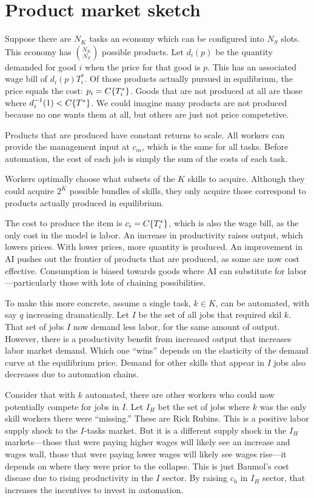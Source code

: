\documentclass{article}
\begin{document}
\section{Product market sketch}
Suppose there are $N_K$ tasks an economy which can be configured into $N_S$ slots.
This economy has ${N_K \choose N_S}$ possible products.
Let $d_i(p)$ be the quantity demanded for good $i$ when the price for that good is $p$.
This has an associated wage bill of $d_i(p) T^*_i$.
Of those products actually pursued in equilibrium, the price equals the cost: $p_i = C\{ T^*_i \}$. 
Goods that are not produced at all are those where $d^{-1}_i(1) < C\{ T^* \}$.
We could imagine many products are not produced because no one wants them at all, but others are just not price competetive.

Products that are produced have constant returns to scale.
All workers can provide the management input at $c_m$, which is the same for all tasks.
Before automation, the cost of each job is simply the sum of the costs of each task.

Workers optimally choose what subsets of the $K$ skills to acquire.
Although they could acquire $2^K$ possible bundles of skills, they only acquire those correspond to products actually produced in equilibrium.  

The cost to produce the item is $c_i = C\{ T^*_i \}$, which is also the wage bill, as the only cost in the model is labor.
An increase in productivity raises output, which lowers prices.
With lower prices, more quantity is produced. 
An improvement in AI pushes out the frontier of products that are produced, as some are now cost effective.
Consumption is biased towards goods where AI can substitute for labor---particularly those with lots of chaining possibilities.

To make this more concrete, assume a single task, $k \in K$, can be automated, with say $q$ increasing dramatically.
Let $I$ be the set of all jobs that required skil $k$.
That set of jobs $I$ now demand less labor, for the same amount of output.
However, there is a productivity benefit from increased output that increases labor market demand.
Which one ``wins'' depends on the elasticity of the demand curve at the equilibrium price.
Demand for other skills that appear in $I$ jobs also decreases due to automation chains.

Consider that with $k$ automated, there are other workers who could now potentially compete for jobs in $I$.
Let $I_H$ bet the set of jobs where $k$ was the only skill workers there were ``missing.''
These are Rick Rubins.
This is a positive labor supply shock to the $I$-tasks market.
But it is a different supply shock in the $I_H$ markets---those that were paying higher wages will likely see an increase and wages wall, those that were paying lower wages will likely see wages rise---it depends on where they were prior to the collapse.
This is just Baumol's cost disease due to rising productivity in the $I$ sector.
By raising $c_h$ in $I_H$ sector, that increases the incentives to invest in automation.
\end{document}
